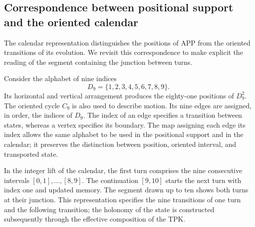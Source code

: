 \subsection{Correspondence between positional support and the oriented calendar}
\label{ii:ampliacion-posicional-calendario}

The calendar representation distinguishes the positions of APP from the
oriented transitions of its evolution. We revisit this correspondence to
make explicit the reading of the segment containing the junction between turns.

Consider the alphabet of nine indices
\[
 D_9=\{1,2,3,4,5,6,7,8,9\}.
\]
Its horizontal and vertical arrangement produces the eighty-one positions
of \(D_9^2\). The oriented cycle \(C_9\) is also used to describe
motion. Its nine edges are assigned, in order, the indices of
\(D_9\). The index of an edge specifies a transition between states,
whereas a vertex specifies its boundary. The map assigning
each edge its index allows the same alphabet to be used in the positional
support and in the calendar; it preserves the distinction between position,
oriented interval, and transported state.

In the integer lift of the calendar, the first turn comprises
the nine consecutive intervals \([0,1],\ldots,[8,9]\). The continuation
\([9,10]\) starts the next turn with index one and updated
memory. The segment drawn up to ten shows both turns at their
junction. This representation specifies the nine transitions of
one turn and the following transition; the holonomy of the state is constructed
subsequently through the effective composition of the TPK.


